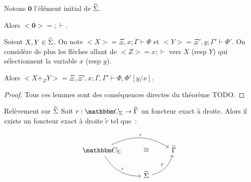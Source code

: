 \begin{lem}
    Notons $\mathbf{0}$ l'élément initial de $\widetilde{\Sigma}$.
    
    Alors $<\mathbf{0}> = ;\vdash$.
\end{lem}

\begin{lem}
    Soient $X,Y\in\widetilde{\Sigma}$. On note $<X> = \Xi,x;\Gamma\vdash\Phi$ et
    $<Y> = \Xi',y;\Gamma'\vdash\Phi'$. On considère de plus les flèches allant de
    $<Z> = x;\vdash$ vers $X$ (resp $Y$) qui sélectionnent la variable $x$ (resp $y$).

    Alors $<X +_Z Y> = \Xi,\Xi',x;\Gamma,\Gamma'\vdash\Phi,\Phi'[y/x]$.
\end{lem}

\begin{proof}
    Tous ces lemmes sont des conséquences directes du théorème TODO.
\end{proof}

\begin{theo}{Relèvement sur $\widetilde{\Sigma}$}
    Soit $r : \C_\Sigma\rightarrow\tgamma$ un foncteur exact à droite. Alors il
    existe un foncteur exact à droite $\tilde{r}$ tel que~:

    \[\begin{tikzcd}
        \C_\Sigma\arrow[dr, bend right, "\iota"]\arrow[rr, bend left, "r"]
            & \cong & \tgamma \\
        & \tsigma\arrow[ur, bend right, "\tilde{r}"] & \\
    \end{tikzcd}\]
\end{theo}

